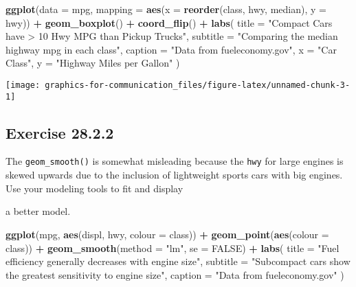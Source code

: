 \documentclass[]{book}
\newenvironment{Shaded}{\begin{snugshade}}{\end{snugshade}}
\newcommand{\DataTypeTok}[1]{\textcolor[rgb]{0.13,0.29,0.53}{#1}}
\newcommand{\KeywordTok}[1]{\textcolor[rgb]{0.13,0.29,0.53}{\textbf{#1}}}
\newcommand{\NormalTok}[1]{#1}
\newcommand{\OperatorTok}[1]{\textcolor[rgb]{0.81,0.36,0.00}{\textbf{#1}}}
\newcommand{\OtherTok}[1]{\textcolor[rgb]{0.56,0.35,0.01}{#1}}
\newcommand{\StringTok}[1]{\textcolor[rgb]{0.31,0.60,0.02}{#1}}
\theoremstyle{plain}
\theoremstyle{remark}
\begin{document}
\begin{Shaded}
\begin{Highlighting}[]
\KeywordTok{ggplot}\NormalTok{(}\DataTypeTok{data =}\NormalTok{ mpg,}
       \DataTypeTok{mapping =} \KeywordTok{aes}\NormalTok{(}\DataTypeTok{x =} \KeywordTok{reorder}\NormalTok{(class, hwy, median), }\DataTypeTok{y =}\NormalTok{ hwy)) }\OperatorTok{+}
\StringTok{  }\KeywordTok{geom_boxplot}\NormalTok{() }\OperatorTok{+}
\StringTok{  }\KeywordTok{coord_flip}\NormalTok{() }\OperatorTok{+}
\StringTok{  }\KeywordTok{labs}\NormalTok{(}
    \DataTypeTok{title =} \StringTok{"Compact Cars have > 10 Hwy MPG than Pickup Trucks"}\NormalTok{,}
    \DataTypeTok{subtitle =} \StringTok{"Comparing the median highway mpg in each class"}\NormalTok{,}
    \DataTypeTok{caption =} \StringTok{"Data from fueleconomy.gov"}\NormalTok{,}
    \DataTypeTok{x =} \StringTok{"Car Class"}\NormalTok{,}
    \DataTypeTok{y =} \StringTok{"Highway Miles per Gallon"}
\NormalTok{  )}
\end{Highlighting}
\end{Shaded}

\begin{center}\texttt{[image: graphics-for-communication\_files/figure-latex/unnamed-chunk-3-1]} \end{center}

\hypertarget{exercise-28.2.2}{%
\subsection*{\texorpdfstring{Exercise
{28.2.2}}{Exercise 28.2.2}}\label{exercise-28.2.2}}

The \texttt{geom\_smooth()} is somewhat misleading because the
\texttt{hwy} for large engines is skewed upwards due to the inclusion of
lightweight sports cars with big engines. Use your modeling tools to fit
and display

a better model.

\begin{Shaded}
\begin{Highlighting}[]
\KeywordTok{ggplot}\NormalTok{(mpg, }\KeywordTok{aes}\NormalTok{(displ, hwy, }\DataTypeTok{colour =}\NormalTok{ class)) }\OperatorTok{+}
\StringTok{  }\KeywordTok{geom_point}\NormalTok{(}\KeywordTok{aes}\NormalTok{(}\DataTypeTok{colour =}\NormalTok{ class)) }\OperatorTok{+}
\StringTok{  }\KeywordTok{geom_smooth}\NormalTok{(}\DataTypeTok{method =} \StringTok{"lm"}\NormalTok{, }\DataTypeTok{se =} \OtherTok{FALSE}\NormalTok{) }\OperatorTok{+}
\StringTok{  }\KeywordTok{labs}\NormalTok{(}
    \DataTypeTok{title =} \StringTok{"Fuel efficiency generally decreases with engine size"}\NormalTok{,}
    \DataTypeTok{subtitle =} \StringTok{"Subcompact cars show the greatest sensitivity to engine size"}\NormalTok{,}
    \DataTypeTok{caption =} \StringTok{"Data from fueleconomy.gov"}
\NormalTok{  )}
\end{Highlighting}
\end{Shaded}
\end{document}
